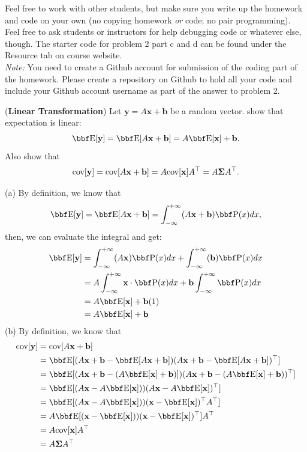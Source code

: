 \documentclass[12pt,letterpaper]{hmcpset}
\begin{document}
Feel free to work with other students, but make sure you write up the homework
and code on your own (no copying homework \textit{or} code; no pair programming).
Feel free to ask students or instructors for help debugging code or whatever else,
though.
The starter code for problem 2 part c and d can be found under the Resource tab on course website.\\

\textit{Note:} You need to create a Github account for submission of the coding part of the homework. Please create a repository on Github to hold all your code and include your Github account username as part of the answer to problem 2.

\begin{problem}[1]
(\textbf{Linear Transformation}) Let $\mathbf{y} = A\mathbf{x} + \mathbf{b}$ be a random vector.
show that expectation is linear:
\[
    \EE[\yy] = \EE[A\xx + \bb] = A\EE[\xx] + \bb.
\]
Also show that
\[
    {\hbox{cov}}[{\bf y}] = {\hbox{cov}}[A{\bf x} + {\bf b}] = A {\hbox{cov}}[{\bf x}] A^\top = A\hbox{\boldmath$\Sigma$} A^\top.
\]
\end{problem}
\begin{solution}
(a) By definition, we know that 
$$
\EE[\yy] = \EE[A\xx + \bb] = \int_{-\infty}^{+\infty} (A\xx + \bb)\PP(x) dx,
$$
then, we can evaluate the integral and get:
\begin{align*}
\EE[\yy]  & =  \int_{-\infty}^{+\infty} (A\xx) \PP(x) dx +  \int_{-\infty}^{+\infty} ( \bb)\PP(x) dx \\
&  = A \int_{-\infty}^{+\infty} \xx \cdot \PP(x) dx + \bb \int_{-\infty}^{+\infty} \PP(x) dx\\
& = A\EE[\xx] + \bb(1) \\ &= A\EE[\xx] + \bb
\end{align*}
(b) By definition, we know that 
\begin{align*}
  \cov[\yy] &= \cov[A\xx + \bb]\\
  &= \EE[(A\xx + \bb - \EE[A\xx + \bb])(A\xx + \bb - \EE[A\xx + \bb])^\T]\\
  &= \EE[(A\xx + \bb - (A\EE[\xx] + \bb)])(A\xx + \bb - (A\EE[\xx] + \bb))^\T]\\
  & = \EE[(A\xx  - A\EE[\xx]))(A\xx - A\EE[\xx] )^\T]\\
  & = \EE[(A\xx  - A\EE[\xx]))(\xx - \EE[\xx] )^\T A^\T] \\ 
  & =A \EE[(\xx  - \EE[\xx]))(\xx - \EE[\xx] )^\T]A^\T \\ 
  &=A \cov[\xx] A^\T \\
  &= A\Sigmab A^\T
\end{align*}
\end{solution}
\newpage
\end{document}
